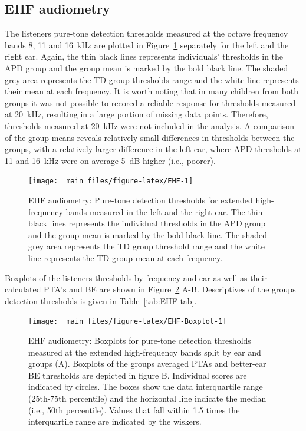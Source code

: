 \documentclass[a4paper, twoside]{templates/ociamthesis}
\begin{document}
\hypertarget{ehf-audiometry}{%
\subsection{EHF audiometry}\label{ehf-audiometry}}

The listeners pure-tone detection thresholds measured at the octave frequency bands 8, 11 and 16~kHz are plotted in Figure~\ref{fig:EHF} separately for the left and the right ear. Again, the thin black lines represents individuals' thresholds in the APD group and the group mean is marked by the bold black line. The shaded grey area represents the TD group thresholds range and the white line represents their mean at each frequency. It is worth noting that in many children from both groups it was not possible to recored a reliable response for thresholds measured at 20~kHz, resulting in a large portion of missing data points. Therefore, thresholds measured at 20~kHz were not included in the analysis. A comparison of the group means reveals relatively small differences in thresholds between the groups, with a relatively larger difference in the left ear, where APD thresholds at 11 and 16~kHz were on average 5~dB higher (i.e., poorer).\\

\begin{figure}

{\centering \texttt{[image: \_main\_files/figure-latex/EHF-1]} 

}

\caption{EHF audiometry: Pure-tone detection thresholds for extended high-frequency bands measured in the left and the right ear. The thin black lines represents the individual thresholds in the APD group and the group mean is marked by the bold black line. The shaded grey area represents the TD group threshold range and the white line represents the TD group mean at each frequency.}\label{fig:EHF}
\end{figure}

Boxplots of the listeners thresholds by frequency and ear as well as their calculated PTA's and BE are shown in Figure~\ref{fig:EHF-Boxplot} A-B. Descriptives of the groups detection thresholds is given in Table~\ref{tab:EHF-tab}.\\

\begin{figure}

{\centering \texttt{[image: \_main\_files/figure-latex/EHF-Boxplot-1]} 

}

\caption{EHF audiometry: Boxplots for pure-tone detection thresholds measured at the extended high-frequency bands split by ear and groups (A). Boxplots of the groups averaged PTAs and better-ear BE thresholds are depicted in figure B. Individual scores are indicated by circles. The boxes show the data interquartile range (25th-75th percentile) and the horizontal line indicate the median (i.e., 50th percentile). Values that fall within 1.5 times the interquartile range are indicated by the wiskers.}\label{fig:EHF-Boxplot}
\end{figure}
\end{document}
